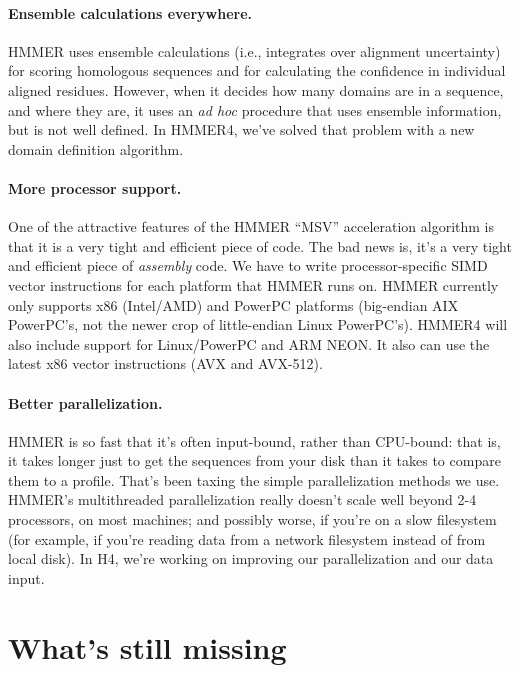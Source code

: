 \paragraph{Ensemble calculations everywhere.} HMMER uses ensemble
calculations (i.e., integrates over alignment uncertainty) for scoring
homologous sequences and for calculating the confidence in individual
aligned residues. However, when it decides how many domains are in a
sequence, and where they are, it uses an \emph{ad hoc} procedure that
uses ensemble information, but is not well defined. In HMMER4, we've
solved that problem with a new domain definition algorithm.

\paragraph{More processor support.} One of the attractive features of the
HMMER ``MSV'' acceleration algorithm is that it is a very tight and
efficient piece of code. The bad news is, it's a very tight and
efficient piece of \emph{assembly} code. We have to write
processor-specific SIMD vector instructions for each platform that
HMMER runs on. HMMER currently only supports x86 (Intel/AMD) and
PowerPC platforms (big-endian AIX PowerPC's, not the newer crop of
little-endian Linux PowerPC's). HMMER4 will also include support for
Linux/PowerPC and ARM NEON. It also can use the latest x86 vector
instructions (AVX and AVX-512).

\paragraph{Better parallelization.} HMMER is so fast that it's often
input-bound, rather than CPU-bound: that is, it takes longer just to
get the sequences from your disk than it takes to compare them to a
profile. That's been taxing the simple parallelization methods we
use. HMMER's multithreaded parallelization really doesn't scale well
beyond 2-4 processors, on most machines; and possibly worse, if you're
on a slow filesystem (for example, if you're reading data from a
network filesystem instead of from local disk). In H4, we're working
on improving our parallelization and our data input.





\section{What's still missing}

